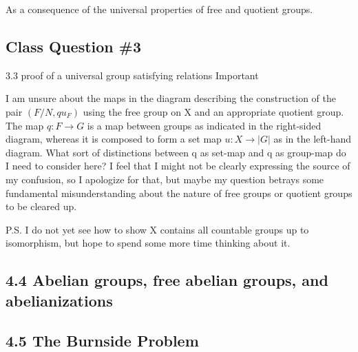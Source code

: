 \documentclass[12pt]{article}
\begin{document}
As a consequence of the universal properties of free and quotient groups.

\subsection{Class Question \#3}

3.3 proof of a universal group satisfying relations
Important

I am unsure about the maps in the diagram describing the construction of the pair $(F\slash N, qu_F)$ using the free group on X and an appropriate quotient group.  The map $q: F \to G$ is a map between groups as indicated in the right-sided diagram, whereas it is composed to form a set map $u : X \to |G|$ as in the left-hand diagram.  What sort of distinctions between q as set-map and q as group-map do I need to consider here?  I feel that I might not be clearly expressing the source of my confusion, so I apologize for that, but maybe my question betrays some fundamental misunderstanding about the nature of free groups or quotient groups to be cleared up.

P.S. I do not yet see how to show X contains all countable groups up to isomorphism, but hope to spend some more time thinking about it.


\subsection{4.4 Abelian groups, free abelian groups, and abelianizations}

\subsection{4.5 The Burnside Problem}
\end{document}
